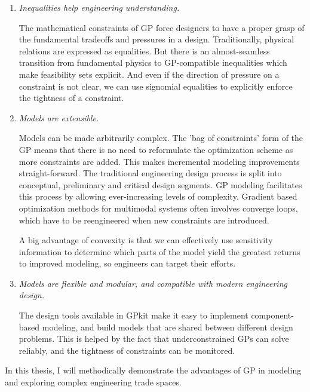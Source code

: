 \begin{enumerate}

    \item \textit{Inequalities help engineering understanding.}

The mathematical constraints of \gls{GP} force designers to have a proper grasp
of the fundamental tradeoffs and pressures in a design.
    Traditionally, physical relations are expressed as equalities. But there is an
almost-seamless transition from fundamental physics to GP-compatible
inequalities which make feasibility sets explicit.
And even if the direction of pressure on a constraint is not clear,
we can use signomial equalities to explicitly enforce the tightness of a
    constraint.

    \item \textit{Models are extensible.}
    
Models can be made arbitrarily complex. The 'bag of constraints' form of the GP
means that there is no need to reformulate the optimization scheme as more
constraints are added. This makes incremental modeling improvements straight-forward.
The traditional engineering design process is split into conceptual, preliminary
and critical design segments. GP modeling facilitates this process by allowing
ever-increasing levels of complexity. Gradient based optimization methods for
multimodal systems often involves
converge loops, which have to be reengineered when new constraints are
introduced.

A big advantage of convexity is that we can effectively use sensitivity information
to determine which parts of the
model yield the greatest returns to improved modeling, so engineers can target
their efforts.

    \item \textit{Models are flexible and modular, and compatible with modern
    engineering design.}

The design tools available in GPkit make it easy to
implement component-based modeling, and build models that are shared between
different design problems.
This is helped by the fact that underconstrained \gls{GP}s can solve reliably,
and the tightness of constraints can be monitored.

\end{enumerate}

In this thesis, I will methodically demonstrate the advantages of \gls{GP} in modeling
and exploring complex engineering trade spaces.



